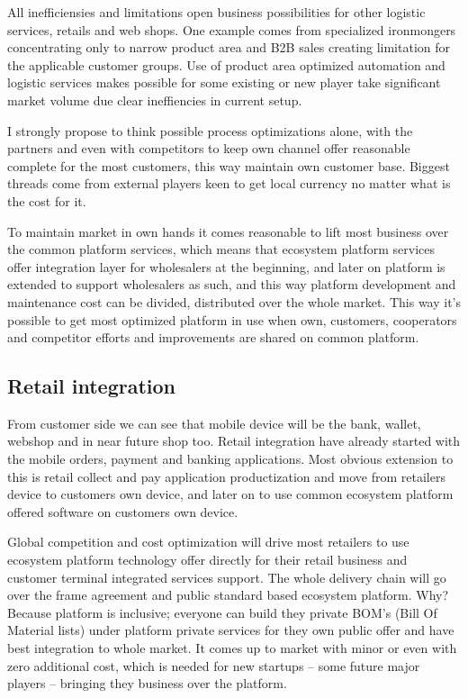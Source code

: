 All inefficiensies and limitations open business possibilities for other
logistic services, retails and web shops. One example comes from specialized
ironmongers concentrating only to narrow product area and B2B sales creating
limitation for the applicable customer groups. Use of product area optimized
automation and logistic services makes possible for some existing or new
player take significant market volume due clear ineffiencies in current setup.

I strongly propose to think possible process optimizations alone, with the
partners and even with competitors to keep own channel offer reasonable
complete for the most customers, this way maintain own customer base. Biggest
threads come from external players keen to get local currency no matter what
is the cost for it.

To maintain market in own hands it comes reasonable to lift most business over
the common platform services, which means that eco\-sys\-tem platform services
offer integration layer for wholesalers at the beginning, and later on
platform is extended to support wholesalers as such, and this way platform
development and maintenance cost can be divided, distributed over the whole
market. This way it's possible to get most optimized platform in use when own,
customers, cooperators and competitor efforts and improvements are shared on
common platform.

\subsection{Retail integration}\label{retail}
From customer side we can see that mobile device will be the bank, wallet,
webshop and in near future shop too. Retail integration have already started
with the mobile orders, payment and banking applications. Most obvious
extension to this is retail collect and pay application
productization\allowbreak\cite{SGroupCollectAndScan} and move from retailers
device to customers own device\allowbreak\cite{
SGroupMobileCollectAndScan}\allowbreak\cite{KGroupScanAndBuy}\allowbreak\cite{
LidlAppScanAndGo}, and later on to use common ecosystem platform offered
software\allowbreak\cite{Ecosystm} on customers own device.

Global competition and cost optimization will drive most retailers to use
ecosystem platform technology offer directly for their retail business and
customer terminal integrated services support. The whole delivery chain will
go over the frame agreement and public standard based ecosystem platform. Why?
Because platform is inclusive; everyone can build they private BOM's (Bill Of
Material lists) under platform private services for they own public offer and
have best integration to whole market. It comes up to market with minor or
even with zero additional cost, which is needed for new startups -- some
future major players -- bringing they business over the platform.

